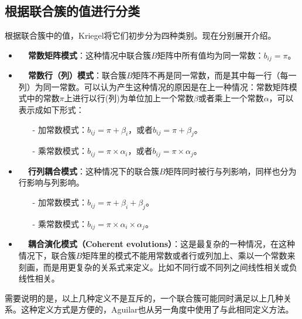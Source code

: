 \subsection{根据联合簇的值进行分类}
根据联合簇中的值，Kriegel\cite{kriegel2009clustering}将它们初步分为四种类别。现在分别展开介绍。
\begin{itemize}
  \item \textbf{~~常数矩阵模式}：这种情况中联合簇$B$矩阵中所有值均为同一常数：$b_{ij} = \pi$。
  \item \textbf{~~常数行（列）模式}：联合簇$B$矩阵不再是同一常数，而是其中每一行（每一列）为同一常数。可以认为产生这种情况的原因是在上一种情况：常数矩阵模式中的常数$\pi$上进行以行(列)为单位加上一个常数$\beta$或者乘上一个常数$\alpha$，可以表示成如下形式：

  \begin{itemize}
    \item[\qquad-] 加常数模式：$b_{ij}=\pi+\beta_i$，或者$b_{ij}=\pi+\beta_j$。
    \item[\qquad-] 乘常数模式：$b_{ij}=\pi\times\alpha_i$，或者$b_{ij}=\pi\times\alpha_j$。
  \end{itemize}

  \item \textbf{~~行列耦合模式}：这种情况下的联合簇$B$矩阵同时被行与列影响，同样也分为行影响与列影响。
    \begin{itemize}
      \item[\qquad-] 加常数模式：$b_{ij}=\pi+\beta_i+\beta_j$。
      \item[\qquad-] 乘常数模式：$b_{ij}=\pi\times\alpha_i\times\alpha_j$。
    \end{itemize}
  \item \textbf{~~耦合演化模式（Coherent evolutions）}：这是最复杂的一种情况，在这种情况下，联合簇$B$矩阵里的模式不能用常数或者行或列加上、乘以一个常数来刻画，而是用更复杂的关系式来定义。比如不同行或不同列之间线性相关或负线性相关。
\end{itemize}

需要说明的是，以上几种定义不是互斥的，一个联合簇可能同时满足以上几种关系。这种定义方式是方便的，Aguilar\cite{aguilar2005shifting}也从另一角度中使用了与此相同定义方法。

